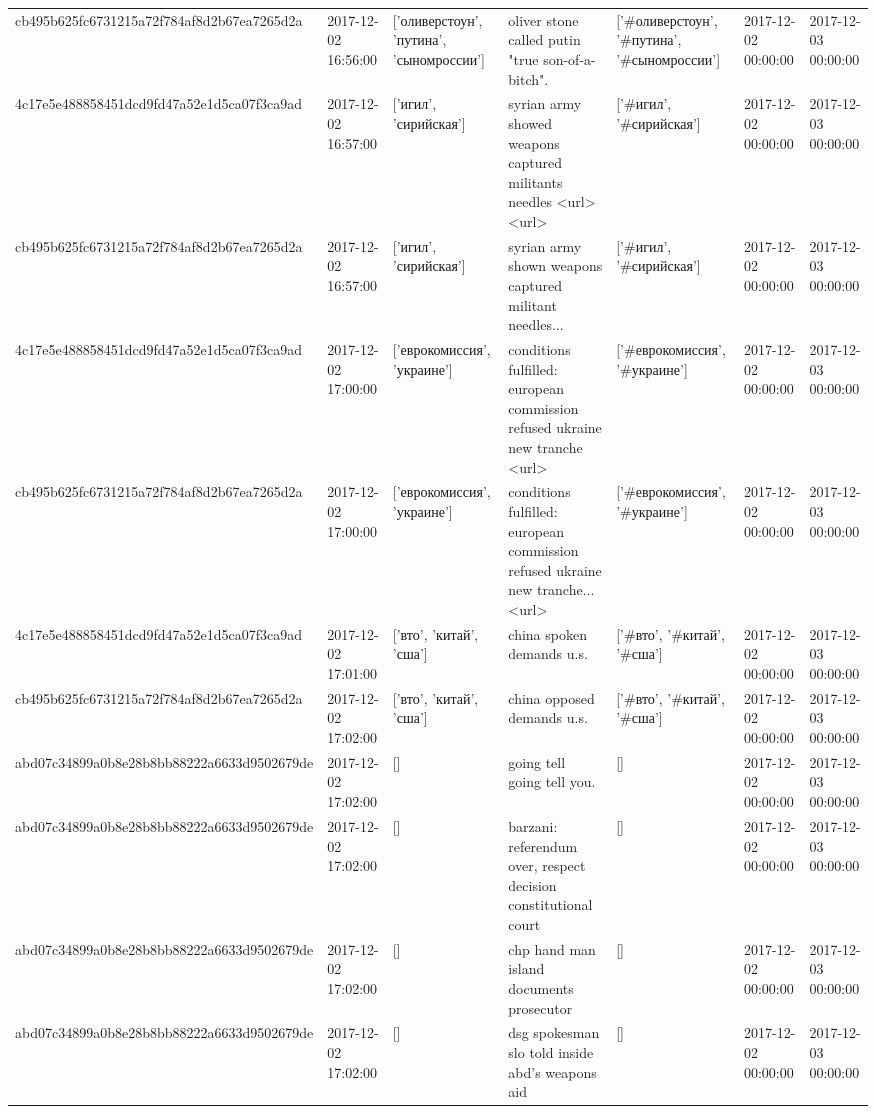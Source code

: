 \begin{tabular}{lllllll}
cb495b625fc6731215a72f784af8d2b67ea7265d2a & 2017-12-02 16:56:00 & ['оливерстоун', 'путина', 'сыномроссии'] & oliver stone called putin "true son-of-a-bitch". & ['#оливерстоун', '#путина', '#сыномроссии'] & 2017-12-02 00:00:00 & 2017-12-03 00:00:00 \\
4c17e5e488858451dcd9fd47a52e1d5ca07f3ca9ad & 2017-12-02 16:57:00 & ['игил', 'сирийская'] & syrian army showed weapons captured militants needles <url> <url> & ['#игил', '#сирийская'] & 2017-12-02 00:00:00 & 2017-12-03 00:00:00 \\
cb495b625fc6731215a72f784af8d2b67ea7265d2a & 2017-12-02 16:57:00 & ['игил', 'сирийская'] & syrian army shown weapons captured militant needles... & ['#игил', '#сирийская'] & 2017-12-02 00:00:00 & 2017-12-03 00:00:00 \\
4c17e5e488858451dcd9fd47a52e1d5ca07f3ca9ad & 2017-12-02 17:00:00 & ['еврокомиссия', 'украине'] & conditions fulfilled: european commission refused ukraine new tranche <url> & ['#еврокомиссия', '#украине'] & 2017-12-02 00:00:00 & 2017-12-03 00:00:00 \\
cb495b625fc6731215a72f784af8d2b67ea7265d2a & 2017-12-02 17:00:00 & ['еврокомиссия', 'украине'] & conditions fulfilled: european commission refused ukraine new tranche... <url> & ['#еврокомиссия', '#украине'] & 2017-12-02 00:00:00 & 2017-12-03 00:00:00 \\
4c17e5e488858451dcd9fd47a52e1d5ca07f3ca9ad & 2017-12-02 17:01:00 & ['вто', 'китай', 'сша'] & china spoken demands u.s. & ['#вто', '#китай', '#сша'] & 2017-12-02 00:00:00 & 2017-12-03 00:00:00 \\
cb495b625fc6731215a72f784af8d2b67ea7265d2a & 2017-12-02 17:02:00 & ['вто', 'китай', 'сша'] & china opposed demands u.s. & ['#вто', '#китай', '#сша'] & 2017-12-02 00:00:00 & 2017-12-03 00:00:00 \\
abd07c34899a0b8e28b8bb88222a6633d9502679de & 2017-12-02 17:02:00 & [] & going tell going tell you. & [] & 2017-12-02 00:00:00 & 2017-12-03 00:00:00 \\
abd07c34899a0b8e28b8bb88222a6633d9502679de & 2017-12-02 17:02:00 & [] & barzani: referendum over, respect decision constitutional court & [] & 2017-12-02 00:00:00 & 2017-12-03 00:00:00 \\
abd07c34899a0b8e28b8bb88222a6633d9502679de & 2017-12-02 17:02:00 & [] & chp hand man island documents prosecutor & [] & 2017-12-02 00:00:00 & 2017-12-03 00:00:00 \\
abd07c34899a0b8e28b8bb88222a6633d9502679de & 2017-12-02 17:02:00 & [] & dsg spokesman slo told inside abd's weapons aid & [] & 2017-12-02 00:00:00 & 2017-12-03 00:00:00 \\

\end{tabular}
